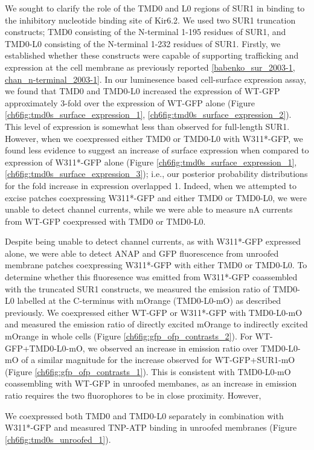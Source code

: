We sought to clarify the role of the TMD0 and L0 regions of SUR1 in binding to the inhibitory nucleotide binding site of Kir6.2.
We used two SUR1 truncation constructs; TMD0 consisting of the N-terminal 1-195 residues of SUR1, and TMD0-L0 consisting of the N-terminal 1-232 residues of SUR1.
Firstly, we established whether these constructs were capable of supporting trafficking and expression at the cell membrane as previously reported \ref{babenko_sur_2003-1, chan_n-terminal_2003-1}.
In our luminesence based cell-surface expression assay, we found that TMD0 and TMD0-L0 increased the expression of WT-GFP approximately 3-fold over the expression of WT-GFP alone (Figure \ref{ch6fig:tmd0s_surface_expression_1}, \ref{ch6fig:tmd0s_surface_expression_2}).
This level of expression is somewhat less than observed for full-length SUR1.
However, when we coexpressed either TMD0 or TMD0-L0 with W311*-GFP, we found less evidence to suggest an increase of surface expression when compared to expression of W311*-GFP alone (Figure \ref{ch6fig:tmd0s_surface_expression_1}, \ref{ch6fig:tmd0s_surface_expression_3});
i.e., our posterior probability distributions for the fold increase in expression overlapped 1.
Indeed, when we attempted to excise patches coexpressing W311*-GFP and either TMD0 or TMD0-L0, we were unable to detect channel currents, while we were able to measure \si{\nano\ampere} currents from WT-GFP coexpressed with TMD0 or TMD0-L0.

Despite being unable to detect channel currents, as with W311*-GFP expressed alone, we were able to detect ANAP and GFP fluorescence from unroofed membrane patches coexpressing W311*-GFP with either TMD0 or TMD0-L0.
To determine whether this fluoresence was emitted from W311*-GFP coassembled with the truncated SUR1 constructs, we measured the emission ratio of TMD0-L0 labelled at the C-terminus with mOrange (TMD0-L0-mO) as described previously.
We coexpressed either WT-GFP or W311*-GFP with TMD0-L0-mO and measured the emission ratio of directly excited mOrange to indirectly excited mOrange in whole cells (Figure \ref{ch6fig:gfp_ofp_contrasts_2}).
For WT-GFP+TMD0-L0-mO, we observed an increase in emission ratio over TMD0-L0-mO of a similar magnitude for the increase observed for WT-GFP+SUR1-mO (Figure \ref{ch6fig:gfp_ofp_contrasts_1}).
This is consistent with TMD0-L0-mO coassembling with WT-GFP in unroofed membanes, as an increase in emission ratio requires the two fluorophores to be in close proximity.
However, 


We coexpressed both TMD0 and TMD0-L0 separately in combination with W311*-GFP and measured TNP-ATP binding in unroofed membranes (Figure \ref{ch6fig:tmd0s_unroofed_1}).

